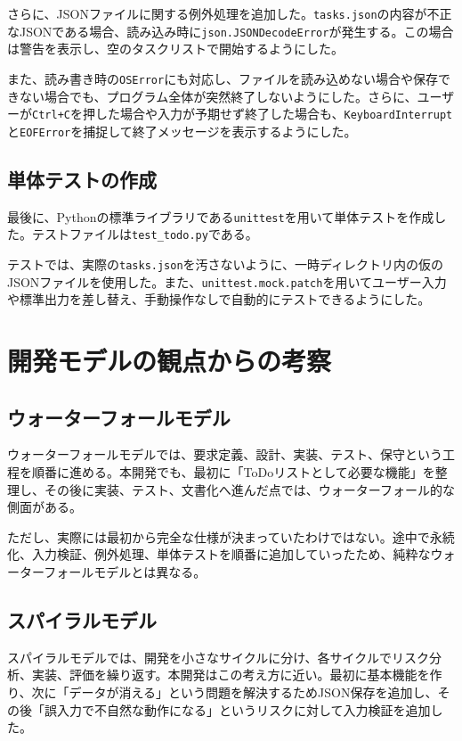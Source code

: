 \documentclass[uplatex,a4paper,11pt]{jsarticle}
\begin{document}
さらに、JSONファイルに関する例外処理を追加した。\texttt{tasks.json}の内容が不正なJSONである場合、読み込み時に\texttt{json.JSONDecodeError}が発生する。この場合は警告を表示し、空のタスクリストで開始するようにした。

また、読み書き時の\texttt{OSError}にも対応し、ファイルを読み込めない場合や保存できない場合でも、プログラム全体が突然終了しないようにした。さらに、ユーザーが\texttt{Ctrl+C}を押した場合や入力が予期せず終了した場合も、\texttt{KeyboardInterrupt}と\texttt{EOFError}を捕捉して終了メッセージを表示するようにした。

\subsection{単体テストの作成}

最後に、Pythonの標準ライブラリである\texttt{unittest}を用いて単体テストを作成した。テストファイルは\texttt{test\_todo.py}である。

テストでは、実際の\texttt{tasks.json}を汚さないように、一時ディレクトリ内の仮のJSONファイルを使用した。また、\texttt{unittest.mock.patch}を用いてユーザー入力や標準出力を差し替え、手動操作なしで自動的にテストできるようにした。

\section{開発モデルの観点からの考察}

\subsection{ウォーターフォールモデル}

ウォーターフォールモデルでは、要求定義、設計、実装、テスト、保守という工程を順番に進める。本開発でも、最初に「ToDoリストとして必要な機能」を整理し、その後に実装、テスト、文書化へ進んだ点では、ウォーターフォール的な側面がある。

ただし、実際には最初から完全な仕様が決まっていたわけではない。途中で永続化、入力検証、例外処理、単体テストを順番に追加していったため、純粋なウォーターフォールモデルとは異なる。

\subsection{スパイラルモデル}

スパイラルモデルでは、開発を小さなサイクルに分け、各サイクルでリスク分析、実装、評価を繰り返す。本開発はこの考え方に近い。最初に基本機能を作り、次に「データが消える」という問題を解決するためJSON保存を追加し、その後「誤入力で不自然な動作になる」というリスクに対して入力検証を追加した。
\end{document}
